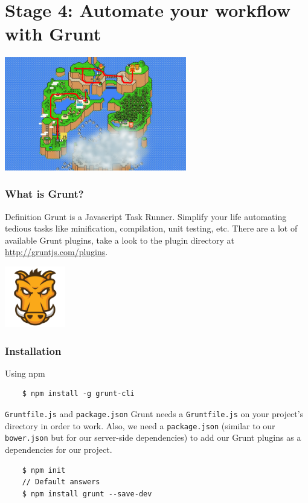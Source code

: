 \section{Stage 4: Automate your workflow with Grunt}

\begin{frame}[fragile]
  \begin{center}
    \includegraphics[width=300px]{images/map_stage_4.png}
  \end{center}
\end{frame}

\begin{frame}[fragile]
  \frametitle{What is Grunt?}
  \begin{block}{Definition}
    Grunt is a Javascript Task Runner. Simplify your life automating tedious tasks like minification, compilation, unit testing, etc. There are a lot of available Grunt plugins, take a look to the plugin directory at \url{http://gruntjs.com/plugins}.
  \end{block}

  \begin{center}
    \includegraphics[width=100px]{images/grunt.png}
  \end{center}
\end{frame}

\begin{frame}[fragile]
  \frametitle{Installation}

  \begin{block}{Using npm}
  {\scriptsize
    \begin{verbatim}
    $ npm install -g grunt-cli
    \end{verbatim}
  }
  \end{block}

  \pause

  \begin{block}{\texttt{Gruntfile.js} and \texttt{package.json}}
    Grunt needs a \texttt{Gruntfile.js} on your project's directory in order to work. Also, we need a \texttt{package.json} (similar to our \texttt{bower.json} but for our server-side dependencies) to add our Grunt plugins as a dependencies for our project.
  {\scriptsize
    \begin{verbatim}
    $ npm init
    // Default answers
    $ npm install grunt --save-dev
    \end{verbatim}
  }
  \end{block}
\end{frame}


